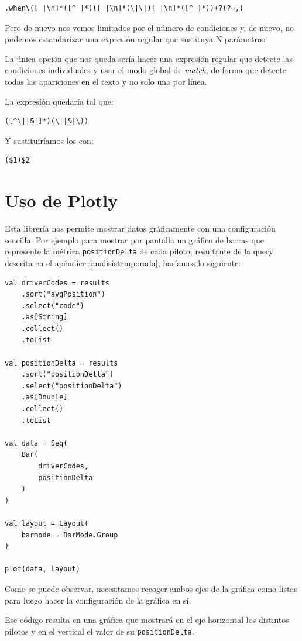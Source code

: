\documentclass[12pt,twoside,titlepage]{report}
\begin{document}
\begin{lstlisting}
.when\([ |\n]*([^ ]*)([ |\n]*(\|\|)[ |\n]*([^ ]*))+?(?=,)
\end{lstlisting}

Pero de nuevo nos vemos limitados por el número de condiciones y, de nuevo, no podemos estandarizar una expresión regular que sustituya N parámetros.

La única opción que nos queda sería hacer una expresión regular que detecte las condiciones individuales y usar el modo global de \textit{match}, de forma que detecte todas las apariciones en el texto y no solo una por línea.

La expresión quedaría tal que:

\begin{lstlisting}
([^\||&|]*)(\||&|\))
\end{lstlisting}

Y sustituiríamos los con:

\begin{lstlisting}
($1)$2
\end{lstlisting}

\section{Uso de Plotly}
\label{plotly}

Esta librería nos permite mostrar datos gráficamente con una configuración sencilla. Por ejemplo para mostrar por pantalla un gráfico de barras que represente la métrica \texttt{positionDelta} de cada piloto, resultante de la query descrita en el apéndice \ref{analisistemporada}, haríamos lo siguiente:

\begin{lstlisting}
val driverCodes = results
	.sort("avgPosition")
	.select("code")
	.as[String]
	.collect()
	.toList
	
val positionDelta = results
	.sort("positionDelta")
	.select("positionDelta")
	.as[Double]
	.collect()
	.toList
	
val data = Seq(
	Bar(
		driverCodes,  
		positionDelta
	)
)
	
val layout = Layout( 
	barmode = BarMode.Group
)
	
plot(data, layout)
\end{lstlisting}

Como se puede observar, necesitamos recoger ambos ejes de la gráfica como listas para luego hacer la configuración de la gráfica en sí.

Ese código resulta en una gráfica que mostrará en el eje horizontal los distintos pilotos y en el vertical el valor de su \texttt{positionDelta}.
\end{document}

